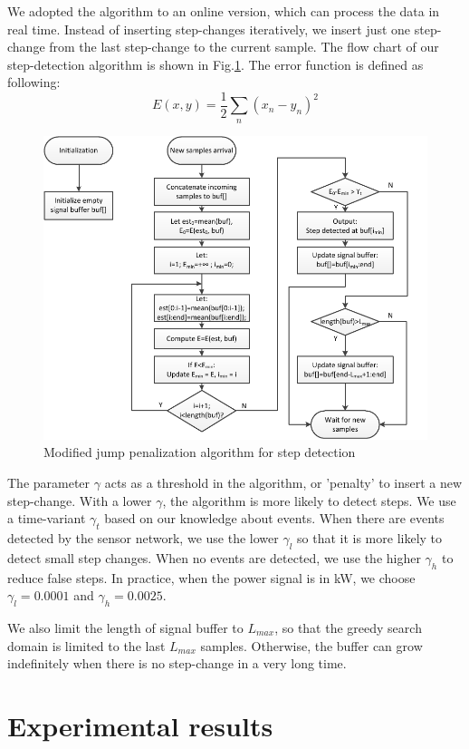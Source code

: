 We adopted the algorithm to an online version, which can process the data in real time.  Instead of inserting step-changes iteratively, we insert just one step-change from the last step-change to the current sample. The flow chart of our step-detection algorithm is shown in Fig.\ref{fig:pwc}. The error function is defined as following: \[E(x,y) = \frac{1}{2} \sum_n \left(x_n - y_n\right)^2\]

\begin{figure}[htb]
  \centering
  \includegraphics[width=\textwidth]{figures/pwc}
  \caption{Modified jump penalization algorithm for step detection}
  \label{fig:pwc}
\end{figure}

The parameter $\gamma$ acts as a threshold in the algorithm, or 'penalty' to insert a new step-change. With a lower $\gamma$, the algorithm is more likely to detect steps. We use a time-variant $\gamma_t$ based on our knowledge about events. When there are events detected by the sensor network, we use the lower $\gamma_l$ so that it is more likely to detect small step changes. When no events are detected, we use the higher $\gamma_h$ to reduce false steps. In practice, when the power signal is in kW, we choose $\gamma_l = 0.0001$ and $\gamma_h=0.0025$. 

We also limit the length of signal buffer to $L_{max}$, so that the greedy search domain is limited to the last $L_{max}$ samples. Otherwise, the buffer can grow indefinitely when there is no step-change in a very long time. 



\section{Experimental results}


